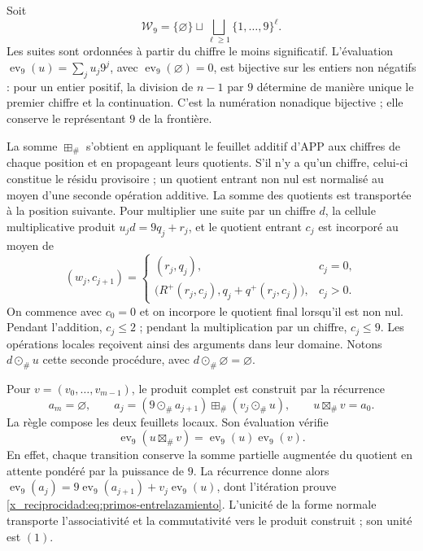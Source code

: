 Soit
\[
 \mathcal W_9=\{\varnothing\}\sqcup
 \bigsqcup_{\ell\geq1}\{1,\ldots,9\}^{\ell}.
\]
Les suites sont ordonnées à partir du chiffre le moins significatif. L'évaluation
\(\operatorname{ev}_9(u)=\sum_j u_j9^j\), avec
\(\operatorname{ev}_9(\varnothing)=0\), est bijective sur les entiers non
négatifs : pour un entier positif, la division de \(n-1\) par \(9\)
détermine de manière unique le premier chiffre et la continuation. C'est la
numération nonadique bijective ; elle conserve le représentant \(9\) de la
frontière.

La somme \(\boxplus_\#\) s'obtient en appliquant le feuillet additif d'APP aux chiffres de chaque position et en propageant leurs quotients. S'il n'y a qu'un chiffre, celui-ci constitue le résidu provisoire ; un quotient entrant non nul est normalisé au moyen d'une seconde opération additive. La somme des quotients est transportée à la position suivante. Pour multiplier une suite par un chiffre \(d\), la cellule multiplicative produit \(u_jd=9q_j+r_j\), et le quotient entrant \(c_j\) est incorporé au moyen de
\[
 (w_j,c_{j+1})=
 \begin{cases}
 (r_j,q_j),&c_j=0,\\
 \bigl(R^+(r_j,c_j),q_j+q^+(r_j,c_j)\bigr),&c_j>0.
 \end{cases}
\]
On commence avec \(c_0=0\) et on incorpore le quotient final lorsqu'il est non
nul. Pendant l'addition, \(c_j\leq2\) ; pendant la multiplication par un chiffre,
\(c_j\leq9\). Les opérations locales reçoivent ainsi des arguments dans
leur domaine. Notons \(d\odot_\#u\) cette seconde procédure,
avec \(d\odot_\#\varnothing=\varnothing\).

Pour \(v=(v_0,\ldots,v_{m-1})\), le produit complet est construit par
la récurrence
\[
 a_m=\varnothing,\qquad
 a_j=(9\odot_\#a_{j+1})\boxplus_\#(v_j\odot_\#u),
 \qquad u\boxtimes_\#v=a_0.
\]
La règle compose les deux feuillets locaux. Son évaluation vérifie
\begin{equation}
 \operatorname{ev}_9(u\boxtimes_\#v)
   =\operatorname{ev}_9(u)\operatorname{ev}_9(v).
 \label{x_reciprocidad:eq:primos-entrelazamiento}
\end{equation}
En effet, chaque transition conserve la somme partielle augmentée du quotient
en attente pondéré par la puissance de \(9\). La récurrence donne alors
\(\operatorname{ev}_9(a_j)=9\operatorname{ev}_9(a_{j+1})+
v_j\operatorname{ev}_9(u)\), dont l'itération prouve
\eqref{x_reciprocidad:eq:primos-entrelazamiento}. L'unicité de la forme normale transporte
l'associativité et la commutativité vers le produit construit ; son unité est \((1)\).


